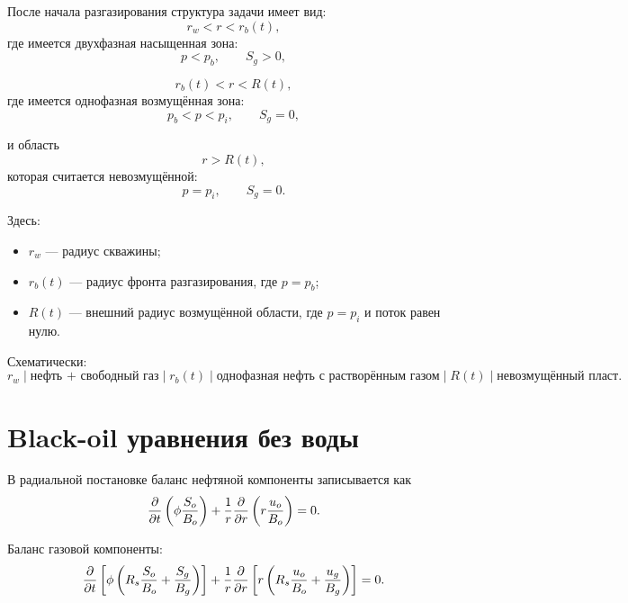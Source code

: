 \documentclass[12pt,a4paper]{article}
\begin{document}
После начала разгазирования структура задачи имеет вид:
\begin{equation}
    r_w < r < r_b(t),
\end{equation}
где имеется двухфазная насыщенная зона:
\begin{equation}
    p < p_b, \qquad S_g > 0,
\end{equation}

\begin{equation}
    r_b(t) < r < R(t),
\end{equation}
где имеется однофазная возмущённая зона:
\begin{equation}
    p_b < p < p_i, \qquad S_g = 0,
\end{equation}

и область
\begin{equation}
    r > R(t),
\end{equation}
которая считается невозмущённой:
\begin{equation}
    p = p_i, \qquad S_g = 0.
\end{equation}

Здесь:
\begin{itemize}[noitemsep]
    \item $r_w$ --- радиус скважины;
    \item $r_b(t)$ --- радиус фронта разгазирования, где $p=p_b$;
    \item $R(t)$ --- внешний радиус возмущённой области, где $p=p_i$ и поток равен нулю.
\end{itemize}

Схематически:
\begin{equation}
    r_w
    \; | \;
    \text{нефть + свободный газ}
    \; | \;
    r_b(t)
    \; | \;
    \text{однофазная нефть с растворённым газом}
    \; | \;
    R(t)
    \; | \;
    \text{невозмущённый пласт}.
\end{equation}

\section{Black-oil уравнения без воды}

В радиальной постановке баланс нефтяной компоненты записывается как
\begin{equation}
    \pdv{}{t}
    \left(
        \phi \frac{S_o}{B_o}
    \right)
    +
    \frac{1}{r}\pdv{}{r}
    \left(
        r \frac{u_o}{B_o}
    \right)
    =0.
\end{equation}

Баланс газовой компоненты:
\begin{equation}
    \pdv{}{t}
    \left[
        \phi
        \left(
            R_s \frac{S_o}{B_o}
            +
            \frac{S_g}{B_g}
        \right)
    \right]
    +
    \frac{1}{r}\pdv{}{r}
    \left[
        r
        \left(
            R_s \frac{u_o}{B_o}
            +
            \frac{u_g}{B_g}
        \right)
    \right]
    =0.
\end{equation}
\end{document}
